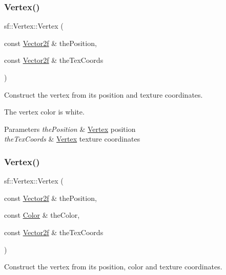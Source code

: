 \subsubsection{\texorpdfstring{Vertex()}{Vertex()}\hspace{0.1cm}{\footnotesize\ttfamily [3/4]}}
{\footnotesize\ttfamily sf\+::\+Vertex\+::\+Vertex (\begin{DoxyParamCaption}\item[{const \hyperlink{classsf_1_1_vector2}{Vector2f} \&}]{the\+Position,  }\item[{const \hyperlink{classsf_1_1_vector2}{Vector2f} \&}]{the\+Tex\+Coords }\end{DoxyParamCaption})}



Construct the vertex from its position and texture coordinates. 

The vertex color is white.


\begin{DoxyParams}{Parameters}
{\em the\+Position} & \hyperlink{classsf_1_1_vertex}{Vertex} position \\
\hline
{\em the\+Tex\+Coords} & \hyperlink{classsf_1_1_vertex}{Vertex} texture coordinates \\
\hline
\end{DoxyParams}
\mbox{\label{classsf_1_1_vertex_ad5943f2b3cbc64b6e714bb37ccaf4960}} 
\subsubsection{\texorpdfstring{Vertex()}{Vertex()}\hspace{0.1cm}{\footnotesize\ttfamily [4/4]}}
{\footnotesize\ttfamily sf\+::\+Vertex\+::\+Vertex (\begin{DoxyParamCaption}\item[{const \hyperlink{classsf_1_1_vector2}{Vector2f} \&}]{the\+Position,  }\item[{const \hyperlink{classsf_1_1_color}{Color} \&}]{the\+Color,  }\item[{const \hyperlink{classsf_1_1_vector2}{Vector2f} \&}]{the\+Tex\+Coords }\end{DoxyParamCaption})}



Construct the vertex from its position, color and texture coordinates. 


